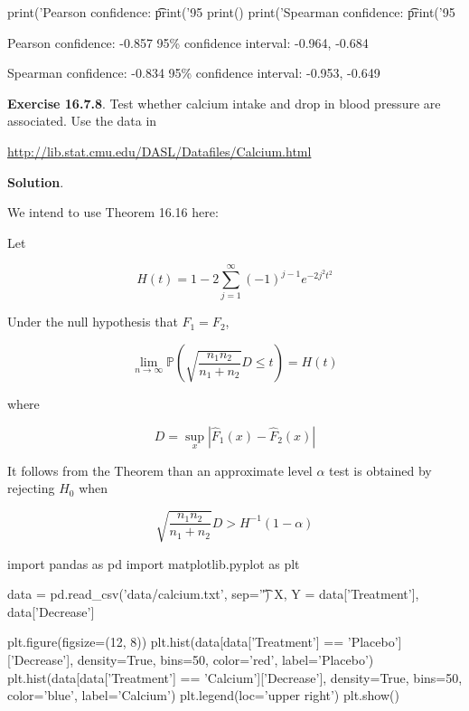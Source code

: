 \begin{python}
print('Pearson confidence: \t %
print('95%
print()
print('Spearman confidence: \t %
print('95%
\end{python}

\begin{console}
Pearson confidence:      -0.857
95\% confidence interval: -0.964, -0.684

Spearman confidence:     -0.834
95\% confidence interval: -0.953, -0.649
\end{console}

\textbf{Exercise 16.7.8}. Test whether calcium intake and drop in blood
pressure are associated. Use the data in

\url{http://lib.stat.cmu.edu/DASL/Datafiles/Calcium.html}

\textbf{Solution}.

We intend to use Theorem 16.16 here:

Let

\[ H(t) = 1 - 2 \sum_{j=1}^{\infty} (-1)^{j-1} e^{-2j^{2}t^{2}} \]

Under the null hypothesis that \(F_{1} = F_{2}\),

\[ \lim_{n \rightarrow \infty} \mathbb{P} \left( \sqrt{\frac{n_{1} n_{2}}{n_{1} + n_{2}}} D \leq t \right) = H(t) \]

where

\[ D = \sup_x | \hat{F}_{1}(x) - \hat{F}_{2}(x) |\]

It follows from the Theorem than an approximate level \(\alpha\) test is
obtained by rejecting \(H_{0}\) when

\[ \sqrt{\frac{n_{1} n_{2}}{n_{1} + n_{2}}} D > H^{-1}(1 - \alpha) \]

\begin{python}
import pandas as pd
import matplotlib.pyplot as plt

data = pd.read_csv('data/calcium.txt', sep='\t')
X, Y = data['Treatment'], data['Decrease']
\end{python}

\begin{python}
plt.figure(figsize=(12, 8))
plt.hist(data[data['Treatment'] == 'Placebo']['Decrease'], 
         density=True, bins=50, color='red', label='Placebo')
plt.hist(data[data['Treatment'] == 'Calcium']['Decrease'], 
         density=True, bins=50, color='blue', label='Calcium')
plt.legend(loc='upper right')
plt.show()
\end{python}


